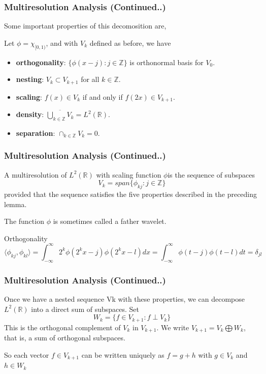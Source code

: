 \documentclass{beamer}
\begin{document}
\begin{frame}
    \frametitle{Multiresolution Analysis (Continued..)}
    Some important properties of this decomosition are, 
    \begin{lemma}[15.3.1]
        Let $\phi = \chi_{[0, 1)}$, and with $V_k$ defined as before, we have
        \begin{itemize}
            \item \textbf{orthogonality}: $\{\phi(x-j) : j \in \mathbb{Z}\}$ is orthonormal basis for $V_0$.
            \item \textbf{nesting}: $V_k \subset V_{k+1}$ for all $k \in \mathbb{Z}$.
            \item \textbf{scaling}: $f(x) \in V_k$ if and only if $f(2x) \in V_{k+1}$.
            \item \textbf{density}: $\overline{\bigcup_{k\in\mathbb{Z}}V_k} = L^2(\mathbb{R})$.
            \item \textbf{separation}: $\cap_{k\in\mathbb{Z}} V_k = {0}$.
        \end{itemize}
    \end{lemma}

\end{frame}
\begin{frame}
    \frametitle{Multiresolution Analysis (Continued..)}
    \begin{definition}[Multiresolution]
        A multiresolution of $L^2(\mathbb{R})$ with scaling function $\phi$is the sequence of subspaces
        $$V_k = span\{ \phi_{kj} : j \in \mathbb{Z} \}$$
        provided that the sequence satisfies the five properties described in the preceding lemma.
    \end{definition}

    The function $\phi$ is sometimes called a father wavelet.

    \begin{block}{}
        Orthogonality
        $$\langle \phi_{kj}, \phi_{kl}\rangle = \int_{-\infty}^{\infty} 2^k\phi(2^kx-j)\phi(2^kx-l)dx = \int_{-\infty}^{\infty} \phi(t-j)\phi(t-l)dt = \delta_{jl}$$
    \end{block}

\end{frame}


\begin{frame}
    \frametitle{Multiresolution Analysis (Continued..)}
    
    Once we have a nested sequence Vk with these properties, 
    we can decompose $L^2(\mathbb{R})$ into a direct sum of subspaces. 
    Set $$W_k = \{f \in V_{k+1} : f \perp V_k\}$$
    This is the orthogonal complement of $V_k$ in $V_{k+1}$. 
    We write $V_{k+1} = V_k \bigoplus W_k$, that is, a sum of orthogonal subspaces. 
    
    So each vector $f \in V_{k+1}$ can be written uniquely as $f =g+h$ with $g\in V_k$ and $h\in W_k$

\end{frame}
\end{document}
